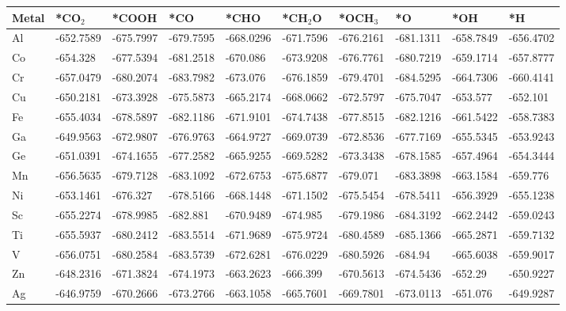 \begin{table}[h]
    \centering
    {\fontsize{6}{12}\selectfont %
    \begin{tabular}{*{10}{l}}
      \hline
      Metal & *CO$_2$ & *COOH    & *CO       & *CHO      & *CH$_2$O  & *OCH$_3$  & *O        & *OH       & *H        \\
      \hline
      Al	& -652.7589	&-675.7997	&-679.7595	&-668.0296	&-671.7596	&-676.2161	&-681.1311	&-658.7849	&-656.4702 \\
      Co	& -654.328  &-677.5394	&-681.2518	&-670.086	  &-673.9208	&-676.7761	&-680.7219	&-659.1714	&-657.8777 \\
      Cr	& -657.0479	&-680.2074	&-683.7982	&-673.076	  &-676.1859	&-679.4701	&-684.5295	&-664.7306	&-660.4141 \\
      Cu	& -650.2181	&-673.3928	&-675.5873	&-665.2174	&-668.0662	&-672.5797	&-675.7047	&-653.577	  &-652.101  \\
      Fe	& -655.4034	&-678.5897	&-682.1186	&-671.9101	&-674.7438	&-677.8515	&-682.1216	&-661.5422	&-658.7383 \\
      Ga	& -649.9563	&-672.9807	&-676.9763	&-664.9727	&-669.0739	&-672.8536	&-677.7169	&-655.5345	&-653.9243 \\
      Ge	& -651.0391	&-674.1655	&-677.2582	&-665.9255	&-669.5282	&-673.3438	&-678.1585	&-657.4964	&-654.3444 \\
      Mn	& -656.5635	&-679.7128	&-683.1092	&-672.6753	&-675.6877	&-679.071	  &-683.3898	&-663.1584	&-659.776  \\
      Ni	& -653.1461	&-676.327	  &-678.5166	&-668.1448	&-671.1502	&-675.5454	&-678.5411	&-656.3929	&-655.1238 \\
      Sc	& -655.2274	&-678.9985	&-682.881	  &-670.9489	&-674.985	  &-679.1986	&-684.3192	&-662.2442	&-659.0243 \\
      Ti	& -655.5937	&-680.2412	&-683.5514	&-671.9689	&-675.9724	&-680.4589	&-685.1366	&-665.2871	&-659.7132 \\
      V	  & -656.0751	&-680.2584	&-683.5739	&-672.6281	&-676.0229	&-680.5926	&-684.94		&-665.6038	&-659.9017 \\
      Zn	& -648.2316	&-671.3824	&-674.1973	&-663.2623	&-666.399  	&-670.5613	&-674.5436	&-652.29	  &-650.9227 \\
      Ag	& -646.9759	&-670.2666	&-673.2766	&-663.1058	&-665.7601	&-669.7801	&-673.0113	&-651.076	  &-649.9287 \\

\end{tabular}}
\end{table}
